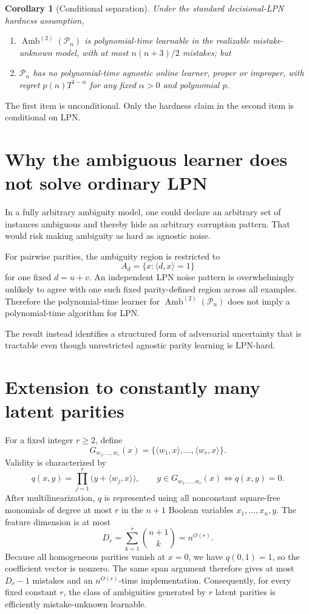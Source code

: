 \documentclass[11pt]{article}
\newtheorem{corollary}[theorem]{Corollary}
\theoremstyle{definition}
\theoremstyle{remark}
\newcommand{\Pn}{\mathcal{P}_n}
\newcommand{\Amb}{\operatorname{Amb}}
\newcommand{\ip}[2]{\langle #1,#2\rangle}
\begin{document}
\begin{corollary}[Conditional separation]
Under the standard decisional-LPN hardness assumption,
\begin{enumerate}[label=(\roman*)]
  \item $\Amb^{(2)}(\Pn)$ is polynomial-time learnable in the realizable
        mistake-unknown model, with at most $n(n+3)/2$ mistakes; but
  \item $\Pn$ has no polynomial-time agnostic online learner, proper or
        improper, with regret $p(n)T^{1-\alpha}$ for any fixed
        $\alpha>0$ and polynomial $p$.
\end{enumerate}
\end{corollary}

The first item is unconditional.  Only the hardness claim in the second item
is conditional on LPN.

\section{Why the ambiguous learner does not solve ordinary LPN}

In a fully arbitrary ambiguity model, one could declare an arbitrary set of
instances ambiguous and thereby hide an arbitrary corruption pattern.  That
would risk making ambiguity as hard as agnostic noise.

For pairwise parities, the ambiguity region is restricted to
\[
  A_d=\{x:\ip{d}{x}=1\}
\]
for one fixed $d=u+v$.  An independent LPN noise pattern is overwhelmingly
unlikely to agree with one such fixed parity-defined region across all
examples.  Therefore the polynomial-time learner for
$\Amb^{(2)}(\Pn)$ does not imply a polynomial-time algorithm for LPN.

The result instead identifies a structured form of adversarial uncertainty
that is tractable even though unrestricted agnostic parity learning is
LPN-hard.

\section{Extension to constantly many latent parities}

For a fixed integer $r\geq 2$, define
\[
  G_{w_1,\ldots,w_r}(x)
  =
  \{\ip{w_1}{x},\ldots,\ip{w_r}{x}\}.
\]
Validity is characterized by
\[
  q(x,y)
  =
  \prod_{j=1}^r\bigl(y+\ip{w_j}{x}\bigr),
  \qquad
  y\in G_{w_1,\ldots,w_r}(x)
  \Longleftrightarrow
  q(x,y)=0.
\]
After multilinearization, $q$ is represented using all nonconstant
square-free monomials of degree at most $r$ in the $n+1$ Boolean variables
$x_1,\ldots,x_n,y$.  The feature dimension is at most
\[
  D_r
  =
  \sum_{k=1}^r\binom{n+1}{k}
  =
  n^{O(r)}.
\]
Because all homogeneous parities vanish at $x=0$, we have $q(0,1)=1$, so the
coefficient vector is nonzero.  The same span argument therefore gives at
most $D_r-1$ mistakes and an $n^{O(r)}$-time implementation.  Consequently,
for every fixed constant $r$, the class of ambiguities generated by $r$
latent parities is efficiently mistake-unknown learnable.
\end{document}
